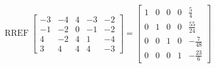 \begin{exerciseAnswer} 


\[\operatorname{RREF} \left[\begin{array}{ccccc}
-3 & -4 & 4 & -3 & -2 \\
-1 & -2 & 0 & -1 & -2 \\
4 & -2 & 4 & 1 & -4 \\
3 & 4 & 4 & 4 & -3
\end{array}\right] = \left[\begin{array}{ccccc}
1 & 0 & 0 & 0 & \frac{5}{4} \\
0 & 1 & 0 & 0 & \frac{55}{24} \\
0 & 0 & 1 & 0 & -\frac{7}{48} \\
0 & 0 & 0 & 1 & -\frac{23}{6}
\end{array}\right] \]



\end{exerciseAnswer}
